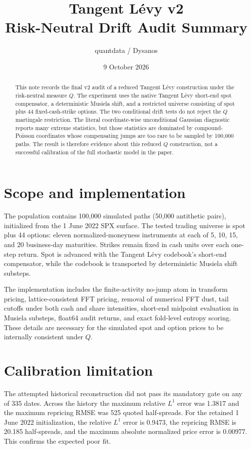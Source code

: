 \documentclass[11pt]{article}
\title{Tangent L\'evy v2\\Risk-Neutral Drift Audit Summary}
\author{quantdata / Dysanos}
\date{9 October 2026}
\begin{document}
\maketitle

\begin{abstract}
This note records the final v2 audit of a reduced Tangent L\'evy construction under
the risk-neutral measure $Q$.  The experiment uses the native Tangent L\'evy
short-end spot compensator, a deterministic Musiela shift, and a restricted
universe consisting of spot plus 44 fixed-cash-strike options.  The two
conditional drift tests do not reject the $Q$ martingale restriction.  The
literal coordinate-wise unconditional Gaussian diagnostic reports many extreme
statistics, but those statistics are dominated by compound-Poisson coordinates
whose compensating jumps are too rare to be sampled by 100,000 paths.  The
result is therefore evidence about this reduced $Q$ construction, not a
successful calibration of the full stochastic model in the paper.
\end{abstract}

\section{Scope and implementation}

The population contains 100,000 simulated paths (50,000 antithetic pairs),
initialized from the 1 June 2022 SPX surface.  The tested trading universe is
spot plus 44 options: eleven normalized-moneyness instruments at each of 5, 10,
15, and 20 business-day maturities.  Strikes remain fixed in cash units over
each one-step return.  Spot is advanced with the Tangent L\'evy codebook's
short-end compensator, while the codebook is transported by deterministic
Musiela shift substeps.

The implementation includes the finite-activity no-jump atom in transform
pricing, lattice-consistent FFT pricing, removal of numerical FFT dust, tail
cutoffs under both cash and share intensities, short-end midpoint evaluation in
Musiela substeps, float64 audit returns, and exact fold-level entropy scoring.
These details are necessary for the simulated spot and option prices to be
internally consistent under $Q$.

\section{Calibration limitation}

The attempted historical reconstruction did not pass its mandatory gate on any
of 335 dates.  Across the history the maximum relative $L^1$ error was 1.3817
and the maximum repricing RMSE was 525 quoted half-spreads.  For the retained
1 June 2022 initialization, the relative $L^1$ error is 0.9473, the repricing
RMSE is 20.185 half-spreads, and the maximum absolute normalized price error is
0.00977.  This confirms the expected poor fit.
\end{document}
